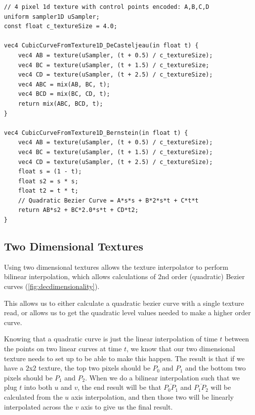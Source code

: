 \documentclass{jcgt}
\begin{document}
\begin{lstlisting}[caption={GLSL for evaluating a cubic curve encoded in a 4 pixel 1d texture.  Linear texture sampling is used to evaluate the linear level of the De Casteljeau algorithm, then the process is continued both with the De Casteljeau algorithm, as well as the Bernstein form of a quadratic Bezier curve.}, label={lst:GLSLCubicTexture1D}]
// 4 pixel 1d texture with control points encoded: A,B,C,D
uniform sampler1D uSampler; 
const float c_textureSize = 4.0;

vec4 CubicCurveFromTexture1D_DeCasteljeau(in float t) {
    vec4 AB = texture(uSampler, (t + 0.5) / c_textureSize);
    vec4 BC = texture(uSampler, (t + 1.5) / c_textureSize;
    vec4 CD = texture(uSampler, (t + 2.5) / c_textureSize);
    vec4 ABC = mix(AB, BC, t);
    vec4 BCD = mix(BC, CD, t);
    return mix(ABC, BCD, t);
}

vec4 CubicCurveFromTexture1D_Bernstein(in float t) {
    vec4 AB = texture(uSampler, (t + 0.5) / c_textureSize);
    vec4 BC = texture(uSampler, (t + 1.5) / c_textureSize);
    vec4 CD = texture(uSampler, (t + 2.5) / c_textureSize);
    float s = (1 - t);
    float s2 = s * s;
    float t2 = t * t;
    // Quadratic Bezier Curve = A*s*s + B*2*s*t + C*t*t
    return AB*s2 + BC*2.0*s*t + CD*t2;
}
\end{lstlisting}

\subsection{Two Dimensional Textures}
Using two dimensional textures allows the texture interpolator to perform bilinear interpolation, which allows calculations of 2nd order (quadratic) Bezier curves (\autoref{fig:decdimensionality}).

This allows us to either calculate a quadratic bezier curve with a single texture read, or allows us to get the quadratic level values needed to make a higher order curve.

Knowing that a quadratic curve is just the linear interpolation of time $t$ between the points on two linear curves at time $t$, we know that our two dimensional texture needs to set up to be able to make this happen.  The result is that if we have a $2$x$2$ texture, the top two pixels should be $P_0$ and $P_1$ and the bottom two pixels should be $P_1$ and $P_2$.  When we do a bilinear interpolation such that we plug $t$ into both $u$ and $v$, the end result will be that $\overline{P_0P_1}$ and $\overline{P_1P_2}$ will be calculated from the $u$ axis interpolation, and then those two will be linearly interpolated across the $v$ axis to give us the final result.
\end{document}
